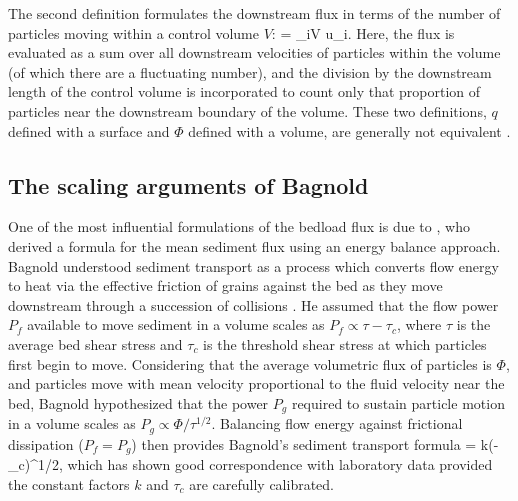 The second definition formulates the downstream flux in terms of the number of particles moving within a control volume $V$:
\be \Phi =  \sum_{i\in V} u_i. \label{eq:controlflux}\ee
Here, the flux is evaluated as a sum over all downstream velocities of particles within the volume (of which there are a fluctuating number), and the division by the downstream length of the control volume is incorporated to count only that proportion of particles near the downstream boundary of the volume. These two definitions, $q$ defined with a surface and $\Phi$ defined with a volume, are generally not equivalent \citep{Ballio2014}.

\subsection{The scaling arguments of Bagnold}
\label{sec:baggo}

One of the most influential formulations of the bedload flux is due to \citet{Bagnold1956,Bagnold1966}, who derived a formula for the mean sediment flux using an energy balance approach.
Bagnold understood sediment transport as a process which converts flow energy to heat via the effective friction \citep[e.g.][]{Bagnold1954} of grains against the bed as they move downstream through a succession of collisions \citep{Bagnold1973}.
He assumed that the flow power $P_f$ available to move sediment in a volume scales as $P_f \propto \tau - \tau_c$, where $\tau$ is the average bed shear stress and $\tau_c$ is the threshold shear stress at which particles first begin to move. 
Considering that the average volumetric flux of particles is $\Phi$, and particles move with mean velocity proportional to the fluid velocity near the bed, Bagnold hypothesized that the power $P_g$ required to sustain particle motion in a volume scales as $P_g \propto \Phi/\tau^{1/2}.$
Balancing flow energy against frictional dissipation ($P_f = P_g$) then provides Bagnold's sediment transport formula
\be \Phi = k(\tau-\tau_c)\tau^{1/2}, \label{eq:bagnold}\ee
which has shown good correspondence with laboratory data provided the constant factors $k$ and $\tau_c$ are carefully calibrated.

